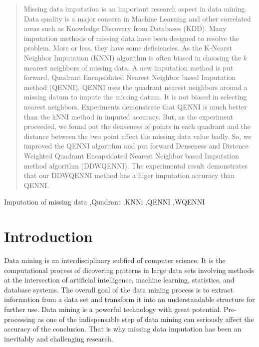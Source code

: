 \documentclass[print]{jicspack}
\begin{document}
\begin{premaker}
\begin{abstract}
Missing data imputation is an important research aspect in data mining. Data quality is a major concern in Machine Learning and other correlated areas such as Knowledge Discovery from Databases (KDD). Many imputation methods of missing data have been designed to resolve the problem. More or less, they have some deficiencies. As the K-Nearst Neighbor Imputation (KNNI) algorithm is often biased in choosing the $k$ mearest neighbors of missing data. A new imputation method is put forward, Quadrant Encapsidated Nearest Neighbor based Imputation method (QENNI). QENNI uses the quadrant nearest neighbors around a missing datum to impute the missing datum. It is not biased in selecting nearest neighbors. Experiments demonstrate that QENNI is much better than the kNNI method in imputed accuracy. But, as the experiment proceeded, we found out the denseness of points in each quadrant and the distance between the two point affect the missing data value badly. So, we improved the QENNI algorithm and put forward Denseness and Distence Weighted Quadrant Encapsidated Nearest Neighbor based Imputation method algorithm (DDWQENNI). The experimental result demonstrates that our DDWQENNI method has a higer imputation accuracy than QENNI.
\end{abstract}
\begin{keyword}
Imputation of missing data \sep Quadrant  \sep KNNi \sep QENNI \sep WQENNI
\end{keyword}
\end{premaker}

\section{Introduction}
\label{Maintext}
Data mining \cite{NumeApp} is an interdisciplinary subfied of computer science. It is the computational process of dicovering patterns in large data sets involving methods at the intersection of artificial intelligence, machine learning, statistics, and database systems. The overall goal of the data mining process is to extract information from a data set and transform it into an understandable structure for further use. Data mining is a powerful technology with great potential. Pre-processing as one of the indispensable step of data mining can seriously affect the accuracy of the conclusion. That is why missing data imputation has been an inevitably and challenging research.
\end{document}
